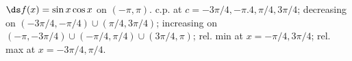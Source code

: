{$\ds f(x) =\sin x\cos x$ on $(-\pi,\pi)$.
}
{c.p. at $c=-3\pi/4,-\pi.4,\pi/4,3\pi/4$; 
decreasing on $(-3\pi/4,-\pi/4) \cup (\pi/4,3\pi/4)$;
increasing on $(-\pi,-3\pi/4)\cup (-\pi/4,\pi/4) \cup (3\pi/4,\pi)$;
rel. min at $x=-\pi/4,3\pi/4$;
rel. max at $x=-3\pi/4,\pi/4$.
}
